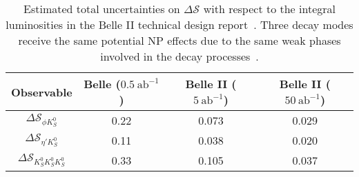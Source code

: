 \begin{table}[htpb]
	\centering
	\caption{ Estimated total uncertainties on $\Delta \mathcal{S}$ with respect to the integral luminosities in the Belle II technical design report~\cite{Abe:2010gxa}. Three decay modes receive the same potential NP effects due to the same weak phases involved in the decay processes~\cite{gershon2004time}.}
	\label{tab:sensitivity}
	\begin{tabular}{c c c c}
		\toprule
		Observable & Belle ($0.5 \: \text{ab}^{-1}$) & Belle II ($5 \: \text{ab}^{-1}$)& Belle II ($50 \: \text{ab}^{-1}$)\\
		\hline
		$\Delta \mathcal{S}_{\phi K^0_S}$ & 0.22 &  0.073 & 0.029\\
		$\Delta \mathcal{S}_{\eta' K^0_S}$   & 0.11 &  0.038 & 0.020\\
		$\Delta \mathcal{S}_{ K^0_S K^0_S K^0_S}$ & 0.33 & 0.105 & 0.037\\
		\bottomrule
	\end{tabular}
\end{table}

\begin{comment}
As the main decay process that have been studied in this thesis, $B^0_d\to K^0_S K^0_S K^0_S$ propagates through $b\to \bar{s}ss$ as well. There are more than one process that will yield the same final states ($3K_S^0$). The difference here is that $3K_S^0$ final states can be produced not only from the $ss$ intermediate state like $f_0(980)$ through penguin mode, but also viable from charm decay (see Fig(1-10)), which $\bar{c}c$ comes from tree level transition. The contribution from tree level process is estimated to be small but must be aware of using Dalitz analysis in future. Similarly, the $\bar{s}s$ intermediate decay, such as $B^0 \to f_0(980)K^0_S$, would also give the same $\it{CP}$-eigenvalue in final states, which is also considered as signal because of $\it{CP}$-even), while $b\to c\to s$ tree level is considered as background that yields $\it{CP}$-odd final states. The previous result in this channel from Belle full dataset \cite{kang2020measurement} is:  $\mathcal{S}$ = -sin2$\phi_1$ = $-0.72\pm 0.23(stats)\pm 0.05(syst)$ and $\mathcal{A}=0.12\pm0.16(stats)\pm 0.05(syst)$. The earlier results from Babar\cite{lees2012amplitude} is: $\mathcal{S}$ = -sin2$\phi_1$ = $-0.94^{+0.21}_{-0.24}(stats)\pm 0.06(syst)$. The results are mostly limited by the statistical uncertainty with minor difference. With the expected luminosity from Belle II in future, we are able to cut off the margin in between the results and the Standard Model. This thesis, as the first trial to perform the $\it{CP}$ measurement on this channel for Belle II, is inevitably dominated by the low data size in the early operation, but will show the good capability and potential in the analysis tools and methods towards the promising future.
\end{comment}

